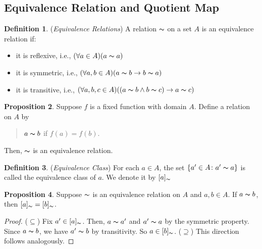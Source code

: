\documentclass[14pt]{article}
\theoremstyle{definition}
\newtheorem{definition}{Definition}[subsection]
\newtheorem{proposition}[definition]{Proposition}
\newcommand{\eq}{\thicksim}
\begin{document}
\subsection{Equivalence Relation and Quotient Map}
\begin{definition}
    (\textit{Equivalence Relations}) A relation $\thicksim$ on a set $A$ is an equivalence relation if:
    \begin{itemize}
        \item it is reflexive, i.e., $(\forall a\in A)(a\thicksim a)$
        \item it is symmetric, i.e., $(\forall a, b \in A)(a\thicksim b \rightarrow b\thicksim a)$
        \item it is transitive, i.e., $(\forall a,b,c \in A)((a\thicksim b \wedge b\thicksim c)\rightarrow a\thicksim c)$
    \end{itemize}
\end{definition}

\vspace{2mm}

\begin{proposition}
    Suppose $f$ is a fixed function with domain $A$. Define a relation on $A$ by
    \begin{quote}
        \centering $a\eq b$ if $f(a)=f(b)$.
    \end{quote}
    Then, $\eq$ is an equivalence relation.
\end{proposition}

\vspace{2mm}

\begin{definition}
    (\textit{Equivalence Class}) For each $a\in A$, the set $\{a'\in A\colon a'\thicksim a\}$ is called the equivalence class of $a$. We denote it by $[a]_{\thicksim}$
\end{definition}

\vspace{2mm}

\begin{proposition}
   Suppose $\thicksim$ is an equivalence relation on $A$ and $a, b \in A$. If $a\thicksim b$, then $[a]_{\thicksim}=[b]_{\thicksim}$.
\end{proposition}

\begin{proof}
    ($\subseteq$) Fix $a'\in [a]_{\thicksim}$. Then, 
     $a\thicksim a'$ and $a'\thicksim a$ by the symmetric property.  Since $a\thicksim b$, we have $a'\thicksim b$ by transitivity. So $a\in[b]_{\eq}$.
    ($\supseteq$) This direction follows analogously. 
\end{proof}
\end{document}
